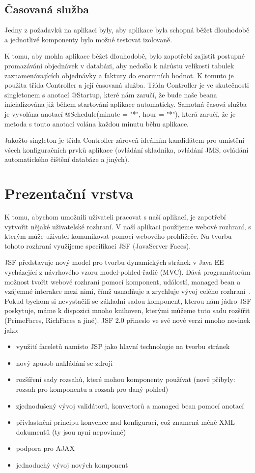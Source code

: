 \documentclass[122pt,oneside]{fithesis}
\begin{document}
\section{Časovaná služba}
Jedny z požadavků na aplikaci byly, aby aplikace byla schopná běžet dlouhodobě a jednotlivé komponenty bylo možné testovat izolovaně. 

K tomu, aby mohla aplikace běžet dlouhodobě, bylo zapotřebí zajistit postupné promazávání objednávek v databázi, aby nedošlo k nárůstu velikostí tabulek zaznamenávajících objednávky a faktury do enormních hodnot. K tomuto je použita třída Controller a její časovaná služba. Třída Controller je ve skutečnosti singletonem s anotací @Startup, které nám zaručí, že bude naše beana inicializována již během startování aplikace automaticky. Samotná časová služba je vyvolána anotací @Schedule(minute = "*", hour = "*"), která zaručí, že je metoda s touto anotací volána každou minutu běhu aplikace. 

Jakožto singleton je třída Controller zároveň ideálním kandidátem pro umístění všech konfiguračních prvků aplikace (ovládání skladníka, ovládání JMS, ovládání automatického čištění databáze a jiných).


\chapter{Prezentační vrstva}
K tomu, abychom umožnili uživateli pracovat s naší aplikací, je zapotřebí vytvořit nějaké uživatelské rozhraní. V naší aplikaci použijeme webové rozhraní, s kterým může uživatel komunikovat pomocí webového prohlížeče. Na tvorbu tohoto rozhraní využijeme specifikaci JSF (JavaServer Faces). 

JSF představuje nový model pro tvorbu dynamických stránek v Java EE vycházející z návrhového vzoru model-pohled-řadič (MVC). Dává programátorům možnost tvořit webové rozhraní pomocí komponent, událostí, managed bean a vzájemné interakce mezi nimi, čímž usnadňuje a zrychluje vývoj celého rozhraní~\cite{goncalves09}. Pokud bychom si nevystačili se základní sadou komponent, kterou nám jádro JSF poskytuje, máme k dispozici mnoho knihoven, kterými můžeme tuto sadu rozšířit (PrimeFaces, RichFaces a jiné). JSF 2.0 přineslo ve své nové verzi mnoho novinek jako:

\begin{itemize}
  \item využití faceletů namísto JSP jako hlavní technologie na tvorbu stránek
  \item nový způsob nakládání se zdroji
  \item rozšíření sady rozsahů, které mohou komponenty používat (nově přibyly: rozsah pro komponentu a rozsah pro daný pohled)
  \item zjednodušený vývoj validátorů, konvertorů a managed bean pomocí anotací
  \item přivlastnění principu konvence nad konfigurací, což znamená méně XML dokumentů (ty jsou nyní nepovinné)
  \item podpora pro AJAX
  \item jednoduchý vývoj nových komponent
\end{itemize}
\end{document}
